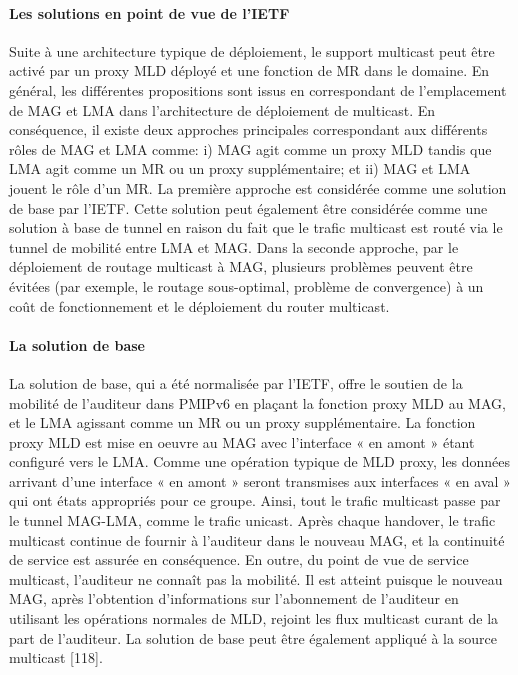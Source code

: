 \paragraph{Les solutions en point de vue de l'IETF}

Suite à une architecture typique de déploiement, le support multicast peut être activé par un proxy MLD déployé et une fonction de MR dans le domaine. En général, les différentes propositions sont issus en correspondant de l'emplacement de MAG et LMA dans l'architecture de déploiement de multicast. En conséquence, il existe deux approches principales correspondant aux différents rôles de MAG et LMA comme: i) MAG agit comme un proxy MLD tandis que LMA agit comme un MR ou un proxy supplémentaire; et ii) MAG et LMA jouent le rôle d'un MR. La première approche est considérée comme une solution de base par l'IETF. Cette solution peut également être considérée comme une solution à base de tunnel en raison du fait que le trafic multicast est routé via le tunnel de mobilité entre LMA et MAG. Dans la seconde approche, par le déploiement de routage multicast à MAG, plusieurs problèmes peuvent être évitées (par exemple, le routage sous-optimal, problème de convergence) à un coût de fonctionnement et le déploiement du router multicast.

\paragraph{La solution de base}
La solution de base, qui a été normalisée par l'IETF, offre le soutien de la mobilité de l'auditeur dans PMIPv6 en plaçant la fonction proxy MLD au MAG, et le LMA agissant comme un MR ou un proxy supplémentaire. La fonction proxy MLD est mise en oeuvre au MAG avec l'interface « en amont » étant configuré vers le LMA. Comme une opération typique de MLD proxy, les données arrivant d'une interface « en amont » seront transmises aux interfaces « en aval » qui ont états appropriés pour ce groupe. Ainsi, tout le trafic multicast passe par le tunnel MAG-LMA, comme le trafic unicast. Après chaque handover, le trafic multicast continue de fournir à l'auditeur dans le nouveau MAG, et la continuité de service est assurée en conséquence. En outre, du point de vue de service multicast, l'auditeur ne connaît pas la mobilité. Il est atteint puisque le nouveau MAG, après l'obtention d'informations sur l'abonnement de l'auditeur en utilisant les opérations normales de MLD, rejoint les flux multicast curant de la part de l'auditeur. La solution de base peut être également appliqué à la source multicast [118].

